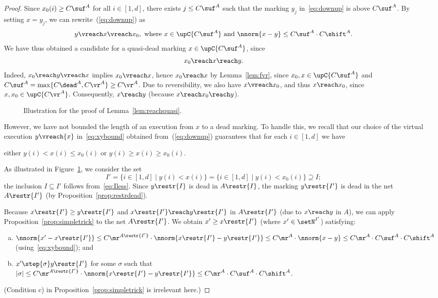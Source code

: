 \begin{proof}
	Since $x_0(i)\geq C\suf^A$ for all $i\in[1,d]$, 
	there exists 	$j\leq C\suf^A$ such that 
	the marking $y_j$ in~\eqref{eq:downup}
	is above $C\suf^A$. By setting $x=y_j$, we can rewrite~(\ref{eq:downup}) as
	\begin{equation}\label{eq:xybound}
		y\vreach x\vreach x_0,\text{ where
		}x\in\upC{C\suf^A}\text{ and }\nnorm{x-y}\leq
		C\suf^A\cdot C\shift^A.
	\end{equation}
	We have thus obtained  a candidate for a quasi-dead marking $x\in\upC{C\suf^A}$, since 
	\begin{equation}\label{eq:candqd}
		x_0\reach x\reach y.
	\end{equation}
	Indeed, $x_0\reach y\vreach x$
	implies $x_0\vreach x$, hence  $x_0\reach x$ by
	Lemma~\ref{lem:fvr}, since 
	$x_0,x\in\upC{C\suf^A}$ and $C\suf^A=\max\{C\dead^A,C\vr^A\}\geq C\vr^A$. Due to
	reversibility, we also have $x\vreach x_0$, and thus  $x\reach
	x_0$, since 	$x,x_0\in\upC{C\vr^A}$.
Consequently, $x\reach y$ (because $x\reach x_0\reach y$).	
\begin{figure}[t]	
	
\caption{Illustration for the proof of
	Lemma~\ref{lem:reachquasi}.}\label{fig:markingstwo}
\end{figure}
	

\noindent
	However,
	we have not bounded the length of an execution from $x$ to a
	dead marking.
	To handle this, we recall that our choice of 
	the virtual execution $y\vreach{x}$ in~\eqref{eq:xybound} obtained
	from~(\ref{eq:downup}) guarantees that
	for each $i\in[1,d]$ we have
\begin{center}
either $y(i)< x(i)\leq x_0(i)$ or $y(i)\geq x(i)\geq x_0(i)$. 
\end{center}
	As illustrated in Figure~\ref{fig:markingstwo},
we consider the set
\[I'=\{i\in[1,d]\mid y(i)< x(i)\}=\{i\in[1,d]\mid y(i)<
	x_0(i)\}\supseteq I;\] 
	the inclusion $I\subseteq I'$ follows from~\eqref{eq:Iless}.
	 Since
	$y\restr{I}$ is dead in $A\restr{I}$, the marking 
$y\restr{I'}$ is dead in the net $A\restr{I'}$ (by
Proposition~\ref{prop:restrdead}). 

Because $x\restr{I'}\geq y\restr{I'}$ and  $x\restr{I'}\reach
y\restr{I'}$ in  $A\restr{I'}$ (due to $x\reach y$ in  $A$),
we can apply Proposition~\ref{prop:simpletrick} to the net
$A\restr{I'}$. We obtain  $x'\geq
x\restr{I'}$ (where $x'\in\setN^{I'}$) satisfying:
\begin{enumerate}[a)]
	\item 
$\nnorm{x'-x\restr{I'}}\leq 
		C\mr^{A\restr{I'}}\cdot
		\nnorm{x\restr{I'}-y\restr{I'}}\leq C\mr^{A}\cdot
		\nnorm{x-y}\leq  C\mr^{A}\cdot C\suf^A\cdot C\shift^A$
		(using~\eqref{eq:xybound}); and
		\item
			$x'\step{\sigma}y\restr{I'}$ for some $\sigma$ 
			such that $|\sigma|\leq C\mr^{A\restr{I'}}\cdot
	\nnorm{x\restr{I'}-y\restr{I'}}\leq C\mr^{A}\cdot C\suf^A\cdot C\shift^A$.
	\end{enumerate}
(Condition c) in Proposition~\ref{prop:simpletrick} is irrelevant
here.)


\end{proof}
